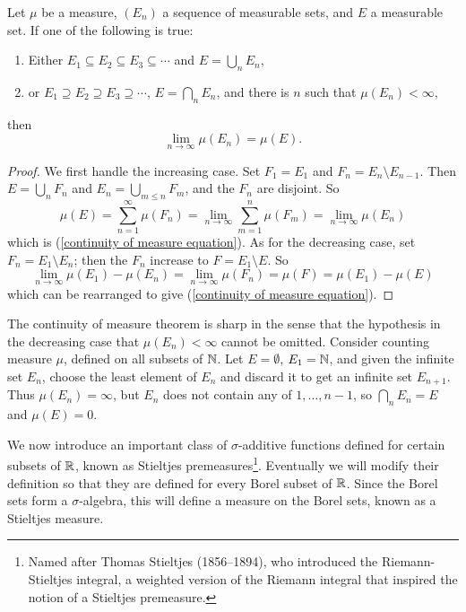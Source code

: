 \begin{theorem}
Let $\mu$ be a measure, $(E_{n})$ a sequence of measurable sets, and $E$ a measurable set.
If one of the following is true:
\begin{enumerate}
\item Either $E_{1} \subseteq E_{2} \subseteq E_{3} \subseteq \cdots$ and $E = \bigcup_{n} E_{n}$,
\item or $E_{1} \supseteq E_{2} \supseteq E_{3} \supseteq \cdots$, $E = \bigcap_{n} E_{n}$, and there is $n$ such that $\mu(E_{n}) < \infty$,
\end{enumerate}
then
\begin{equation}
\label{continuity of measure equation}
\lim_{n \to \infty} \mu(E_{n}) = \mu(E).
\end{equation}

\end{theorem}
\begin{proof}
We first handle the increasing case.
Set $F_{1} = E_{1}$ and $F_{n} = E_{n} \setminus E_{n - 1}$. Then $E = \bigcup_{n} F_{n}$ and $E_{n} = \bigcup_{m \leq n} F_{m}$, and the $F_{n}$ are disjoint.
So
\[\mu(E) = \sum_{n=1}^{\infty} \mu(F_{n}) = \lim_{n \to \infty} \sum_{m=1}^{n} \mu(F_{m}) = \lim_{n \to \infty} \mu(E_{n})\]
which is (\ref{continuity of measure equation}).
As for the decreasing case, set $F_{n} = E_{1} \setminus E_{n}$; then the $F_{n}$ increase to $F = E_{1} \setminus E$. So
\[\lim_{n \to \infty} \mu(E_{1}) - \mu(E_{n}) = \lim_{n \to \infty} \mu(F_{n}) = \mu(F) = \mu(E_{1}) - \mu(E)\]
which can be rearranged to give (\ref{continuity of measure equation}).
\end{proof}

\begin{example}
The continuity of measure theorem is sharp in the sense that the hypothesis in the decreasing case that $\mu(E_{n}) < \infty$ cannot be omitted.
Consider counting measure $\mu$, defined on all subsets of $\mathbb{N}$.
Let $E = \emptyset$, $E_{1} = \mathbb{N}$, and given the infinite set $E_{n}$, choose the least element of $E_{n}$ and discard it to get an infinite set $E_{n + 1}$.
Thus $\mu(E_{n}) = \infty$, but $E_{n}$ does not contain any of $1, \dots, n - 1$, so $\bigcap_{n} E_{n} = E$ and $\mu(E) = 0$.
\end{example}

\begin{subsec}
We now introduce an important class of $\sigma$-additive functions defined for certain subsets of $\mathbb{R}$, known as Stieltjes premeasures\footnote{Named after Thomas Stieltjes (1856--1894), who introduced the Riemann-Stieltjes integral, a weighted version of the Riemann integral that inspired the notion of a Stieltjes premeasure.}.
Eventually we will modify their definition so that they are defined for every Borel subset of $\mathbb{R}$.
Since the Borel sets form a $\sigma$-algebra, this will define a measure on the Borel sets, known as a Stieltjes measure.
\end{subsec}

